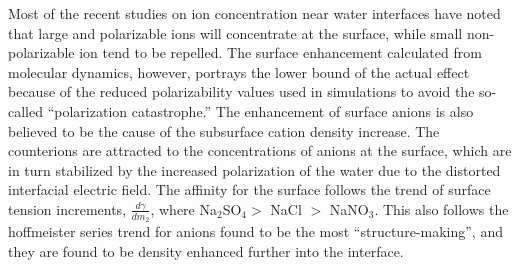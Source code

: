 
Most of the recent studies on ion concentration near water interfaces have noted that large and polarizable ions will concentrate at the surface,\cite{Petersen2005b,Pegram2006,Sloutskin2007,Eggimann2008} while small non-polarizable ion tend to be repelled. The surface enhancement calculated from molecular dynamics, however, portrays the lower bound of the actual effect because of the reduced polarizability values used in simulations to avoid the so-called ``polarization catastrophe.'' The enhancement of surface anions is also believed to be the cause of the subsurface cation density increase. The counterions are attracted to the concentrations of anions at the surface, which are in turn stabilized by the increased polarization of the water due to the distorted interfacial electric field. The affinity for the surface follows the trend of surface tension increments, $\frac{d\gamma}{dm_2}$, where Na$_2$SO$_4 >$ NaCl $>$ NaNO$_3$.\cite{Pegram2006} This also follows the hoffmeister series trend for anions found to be the most ``structure-making'', and they are found to be density enhanced further into the interface.
